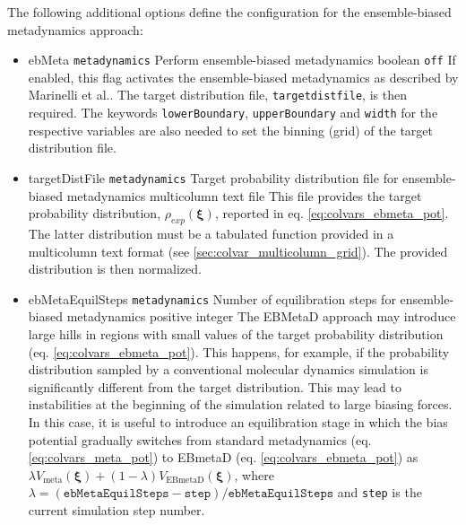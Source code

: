 The following additional options define the configuration for the ensemble-biased metadynamics approach:
\begin{itemize}
\item %
  \keydef
    {ebMeta}{%
    \texttt{metadynamics}}{%
    Perform ensemble-biased metadynamics}{%
    boolean}{%
    \texttt{off}}{%
    If enabled, this flag activates the ensemble-biased metadynamics as
    described by Marinelli et al.\cite{Marinelli2015}. The target distribution file,
    \texttt{targetdistfile}, is then required. The keywords \texttt{lowerBoundary}, \texttt{upperBoundary}
    and \texttt{width} for the respective variables are also needed to set the binning (grid) of the target distribution file.}

\item %
  \key
    {targetDistFile}{%
    \texttt{metadynamics}}{%
    Target probability distribution file for ensemble-biased metadynamics}{%
    multicolumn text file}{%
    This file provides the target probability distribution, $\rho_{exp}(\bm{\xi})$, reported in eq.{} \ref{eq:colvars_ebmeta_pot}. The latter distribution must be a tabulated function provided in a multicolumn text format (see \ref{sec:colvar_multicolumn_grid}).
    The provided distribution is then normalized.
  }

\item %
  \key
    {ebMetaEquilSteps}{%
    \texttt{metadynamics}}{%
    Number of equilibration steps for ensemble-biased metadynamics}{%
    positive integer}{%
    The EBMetaD approach may introduce large hills in regions with small values of the target probability distribution (eq.{} \ref{eq:colvars_ebmeta_pot}).
    This happens, for example, if the probability distribution sampled by a conventional molecular dynamics simulation is significantly different from the target distribution.
    This may lead to instabilities at the beginning of the simulation related to large biasing forces.
    In this case, it is useful to introduce an equilibration stage in which the bias potential gradually switches from standard metadynamics (eq.{} \ref{eq:colvars_meta_pot}) to EBmetaD (eq.{} \ref{eq:colvars_ebmeta_pot}) as $\lambda V_{\mathrm{meta}}(\bm{\xi})+(1-\lambda)V_{\mathrm{EBmetaD}}(\bm{\xi})$, where $\lambda=(\mathtt{ebMetaEquilSteps}-\mathtt{step})/\mathtt{ebMetaEquilSteps}$ and \texttt{step} is the current simulation step number.}


\end{itemize}

